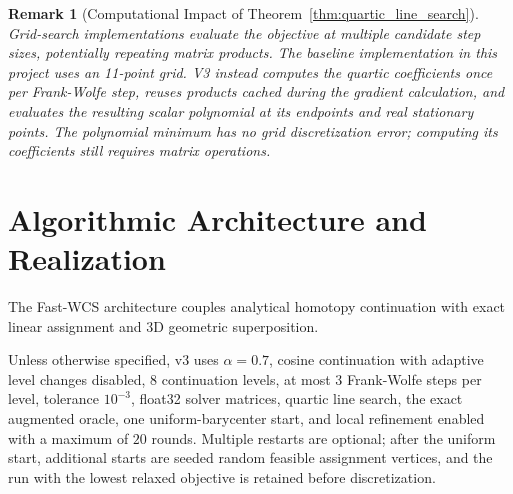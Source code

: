 \documentclass[conference]{IEEEtran}
\newtheorem{remark}{Remark}
\begin{document}
\begin{remark}[Computational Impact of Theorem~\ref{thm:quartic_line_search}]
Grid-search implementations evaluate the objective at multiple candidate step sizes, potentially repeating matrix products. The baseline implementation in this project uses an 11-point grid. V3 instead computes the quartic coefficients once per Frank-Wolfe step, reuses products cached during the gradient calculation, and evaluates the resulting scalar polynomial at its endpoints and real stationary points. The polynomial minimum has no grid discretization error; computing its coefficients still requires matrix operations.
\end{remark}



\section{Algorithmic Architecture and Realization}
\label{sec:algorithms}

The Fast-WCS architecture couples analytical homotopy continuation with exact linear assignment and 3D geometric superposition.

Unless otherwise specified, v3 uses $\alpha=0.7$, cosine continuation with adaptive level changes disabled, $8$ continuation levels, at most $3$ Frank-Wolfe steps per level, tolerance $10^{-3}$, float32 solver matrices, quartic line search, the exact augmented oracle, one uniform-barycenter start, and local refinement enabled with a maximum of $20$ rounds. Multiple restarts are optional; after the uniform start, additional starts are seeded random feasible assignment vertices, and the run with the lowest relaxed objective is retained before discretization.
\end{document}

